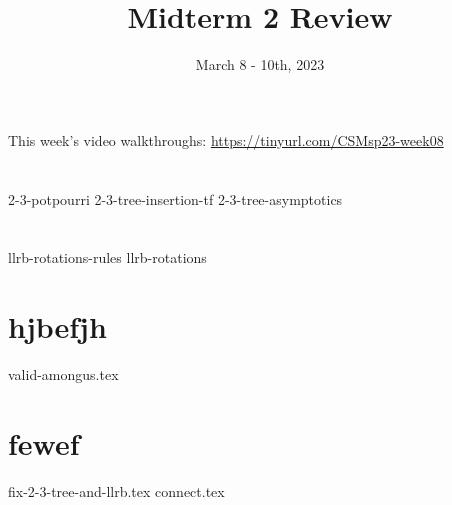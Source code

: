 \documentclass[11pt]{exam}
\title{Midterm 2 Review}
\date{March 8 - 10th, 2023}
\begin{document}
\maketitle
This week's video walkthroughs:
\href{https://tinyurl.com/CSMsp23-week08}{https://tinyurl.com/CSMsp23-week08}


\section{}
\begin{questions}
{2-3-potpourri}  
{2-3-tree-insertion-tf}
{2-3-tree-asymptotics}
\end{questions}


\pagebreak
\section{}
\begin{questions}
{llrb-rotations-rules}
{llrb-rotations}
\end{questions}

% 
\pagebreak

\section{hjbefjh}
\begin{questions}
{valid-amongus.tex}
\end{questions}



\pagebreak
\section{fewef}
\begin{questions}
{fix-2-3-tree-and-llrb.tex}
{connect.tex}
\end{questions}
\end{document}
